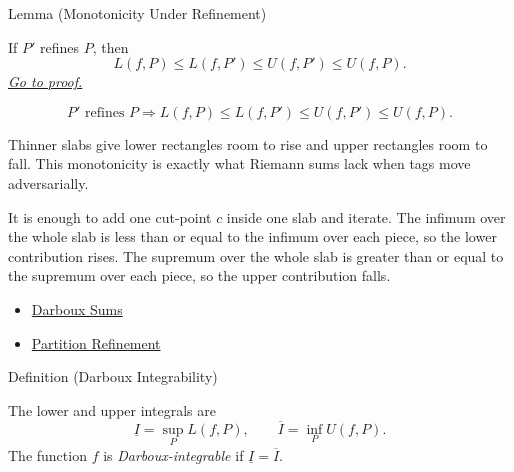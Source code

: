 \begin{lemmabox}{Lemma (Monotonicity Under Refinement)}
\begin{lemma}
\label{lem:darboux-refinement-squeeze}
If \(P'\) refines \(P\), then
\[
  L(f,P)\le L(f,P')\le U(f,P')\le U(f,P).
\]
\hyperref[prf:darboux-refinement-squeeze]{\textit{Go to proof.}}
\end{lemma}
\end{lemmabox}

\begin{remark*}
\[
P'\text{ refines }P
\Longrightarrow
L(f,P)\le L(f,P')\le U(f,P')\le U(f,P).
\]
\end{remark*}

\begin{remark*}[Interpretation]
Thinner slabs give lower rectangles room to rise and upper rectangles room to
fall. This monotonicity is exactly what Riemann sums lack when tags move
adversarially.


It is enough to add one cut-point \(c\) inside one slab and iterate. The
infimum over the whole slab is less than or equal to the infimum over each
piece, so the lower contribution rises. The supremum over the whole slab is
greater than or equal to the supremum over each piece, so the upper
contribution falls.
\end{remark*}

\begin{dependencies}
\begin{itemize}
  \item \hyperref[def:darboux-sums]{Darboux Sums}
  \item \hyperref[def:partition-refinement]{Partition Refinement}
\end{itemize}
\end{dependencies}

\begin{definitionbox}{Definition (Darboux Integrability)}
\begin{definition}
\label{def:darboux-integrability}
The lower and upper integrals are
\[
  \underline I=\sup_P L(f,P),\qquad
  \overline I=\inf_P U(f,P).
\]
The function \(f\) is \emph{Darboux-integrable} if \(\underline I=\overline I\).
\end{definition}
\end{definitionbox}

